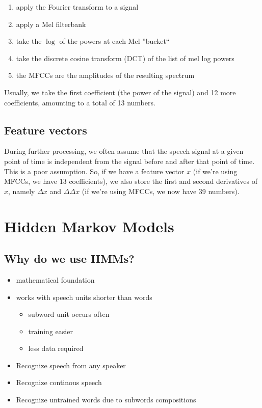 \documentclass[11pt]{article}
\begin{document}
\begin{enumerate}
    \item apply the Fourier transform to a signal
    \item apply a Mel filterbank
    \item take the $\log$ of the powers at each Mel ''bucket``
    \item take the discrete cosine transform (DCT) of the list of mel log powers
    \item the MFCCs are the amplitudes of the resulting spectrum
\end{enumerate}

Usually, we take the first coefficient (the power of the signal) and 12 more coefficients, amounting to a total of 13 numbers.

\subsection{Feature vectors}

During further processing, we often assume that the speech signal at a given point of time is independent from the signal before and after that point of time. This is a poor assumption. So, if we have a feature vector $x$ (if we're using MFCCs, we have 13 coefficients), we also store the first and second derivatives of $x$, namely $\Delta x$ and $\Delta \Delta x$ (if we're using MFCCs, we now have 39 numbers).

\newpage

\section{Hidden Markov Models}

\subsection{Why do we use HMMs?}
\begin{itemize}
\item mathematical foundation
\item works with speech units shorter than words
\begin{itemize}
\item subword unit occurs often
\item training easier
\item less data required
\end{itemize}
\item Recognize speech from any speaker
\item Recognize continous speech
\item Recognize untrained words due to subwords compositions

\end{itemize}
\end{document}
